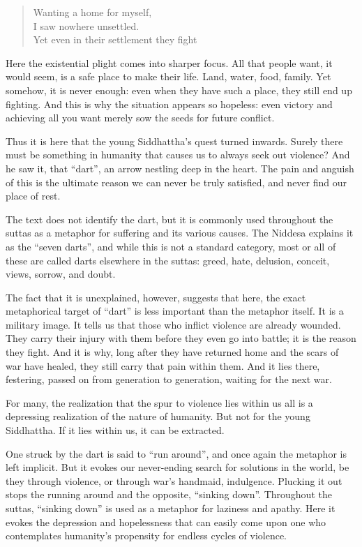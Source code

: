 \documentclass[12pt,openany]{book}%
\begin{document}
\begin{verse}%
Wanting a home for myself, \\
I saw nowhere unsettled. \\
Yet even in their settlement they fight

%
\end{verse}

Here the existential plight comes into sharper focus. All that people want, it would seem, is a safe place to make their life. Land, water, food, family. Yet somehow, it is never enough: even when they have such a place, they still end up fighting. And this is why the situation appears so hopeless: even victory and achieving all you want merely sow the seeds for future conflict.

Thus it is here that the young Siddhattha’s quest turned inwards. Surely there must be something in humanity that causes us to always seek out violence? And he saw it, that “dart”, an arrow nestling deep in the heart. The pain and anguish of this is the ultimate reason we can never be truly satisfied, and never find our place of rest.

The text does not identify the dart, but it is commonly used throughout the suttas as a metaphor for suffering and its various causes. The Niddesa explains it as the “seven darts”, and while this is not a standard category, most or all of these are called darts elsewhere in the suttas: greed, hate, delusion, conceit, views, sorrow, and doubt.

The fact that it is unexplained, however, suggests that here, the exact metaphorical target of “dart” is less important than the metaphor itself. It is a military image. It tells us that those who inflict violence are already wounded. They carry their injury with them before they even go into battle; it is the reason they fight. And it is why, long after they have returned home and the scars of war have healed, they still carry that pain within them. And it lies there, festering, passed on from generation to generation, waiting for the next war.

For many, the realization that the spur to violence lies within us all is a depressing realization of the nature of humanity. But not for the young Siddhattha. If it lies within us, it can be extracted.

One struck by the dart is said to “run around”, and once again the metaphor is left implicit. But it evokes our never-ending search for solutions in the world, be they through violence, or through war's handmaid, indulgence. Plucking it out stops the running around and the opposite, “sinking down”. Throughout the suttas, “sinking down” is used as a metaphor for laziness and apathy. Here it evokes the depression and hopelessness that can easily come upon one who contemplates humanity’s propensity for endless cycles of violence.
\end{document}
